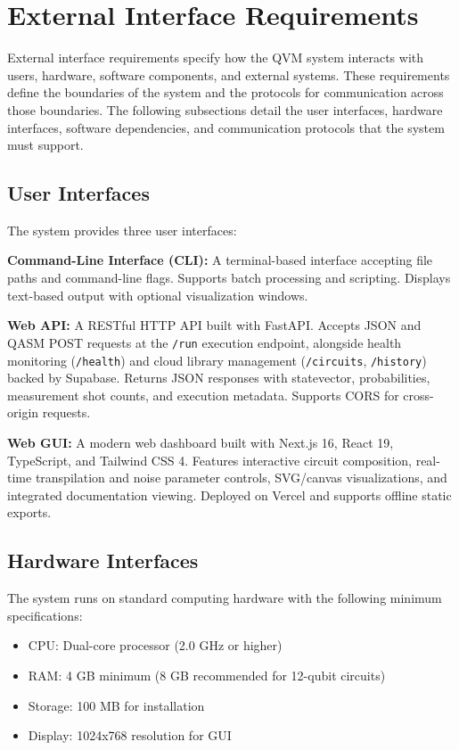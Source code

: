 \section{External Interface Requirements}

External interface requirements specify how the QVM system interacts with users, hardware, software components, and external systems. These requirements define the boundaries of the system and the protocols for communication across those boundaries. The following subsections detail the user interfaces, hardware interfaces, software dependencies, and communication protocols that the system must support.

\subsection{User Interfaces}
The system provides three user interfaces:

\textbf{Command-Line Interface (CLI):} A terminal-based interface accepting file paths and command-line flags. Supports batch processing and scripting. Displays text-based output with optional visualization windows.

\textbf{Web API:} A RESTful HTTP API built with FastAPI. Accepts JSON and QASM POST requests at the \texttt{/run} execution endpoint, alongside health monitoring (\texttt{/health}) and cloud library management (\texttt{/circuits}, \texttt{/history}) backed by Supabase. Returns JSON responses with statevector, probabilities, measurement shot counts, and execution metadata. Supports CORS for cross-origin requests.

\textbf{Web GUI:} A modern web dashboard built with Next.js 16, React 19, TypeScript, and Tailwind CSS 4. Features interactive circuit composition, real-time transpilation and noise parameter controls, SVG/canvas visualizations, and integrated documentation viewing. Deployed on Vercel and supports offline static exports.

\subsection{Hardware Interfaces}
The system runs on standard computing hardware with the following minimum specifications:
\begin{itemize}
\item CPU: Dual-core processor (2.0 GHz or higher)
\item RAM: 4 GB minimum (8 GB recommended for 12-qubit circuits)
\item Storage: 100 MB for installation
\item Display: 1024x768 resolution for GUI
\end{itemize}

